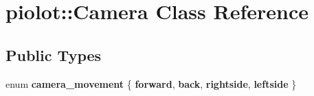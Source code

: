 \hypertarget{classpiolot_1_1_camera}{}\section{piolot\+:\+:Camera Class Reference}
\label{classpiolot_1_1_camera}
\subsection*{Public Types}
\begin{DoxyCompactItemize}
\item 
\mbox{\label{classpiolot_1_1_camera_afba5e0e4539ee7666e8354842c4988e0}} 
enum {\bfseries camera\+\_\+movement} \{ {\bfseries forward}, 
{\bfseries back}, 
{\bfseries rightside}, 
{\bfseries leftside}
 \}
\end{DoxyCompactItemize}
